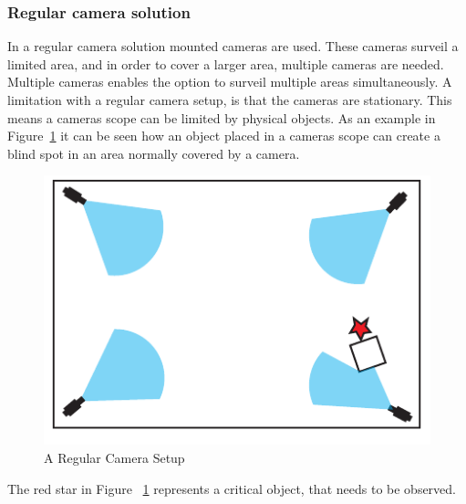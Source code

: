 \subsubsection{Regular camera solution}
In a regular camera solution mounted cameras are used.
These cameras surveil a limited area, and in order to cover a larger area, multiple cameras are needed.
Multiple cameras enables the option to surveil multiple areas simultaneously.
A limitation with a regular camera setup, is that the cameras are stationary.
This means a cameras scope can be limited by physical objects.
As an example in Figure~\ref{fig:refular_camera_setup} it can be seen how an object placed in a cameras scope can create a blind spot in an area normally covered by a camera.
\begin{figure}[htb]
    \centering
    \includegraphics[width=\textwidth]{gfx/regular_camera_setup.pdf}
    \caption{A Regular Camera Setup}
    \label{fig:refular_camera_setup}
\end{figure}
The red star in Figure ~\ref{fig:refular_camera_setup} represents a critical object, that needs to be observed.

